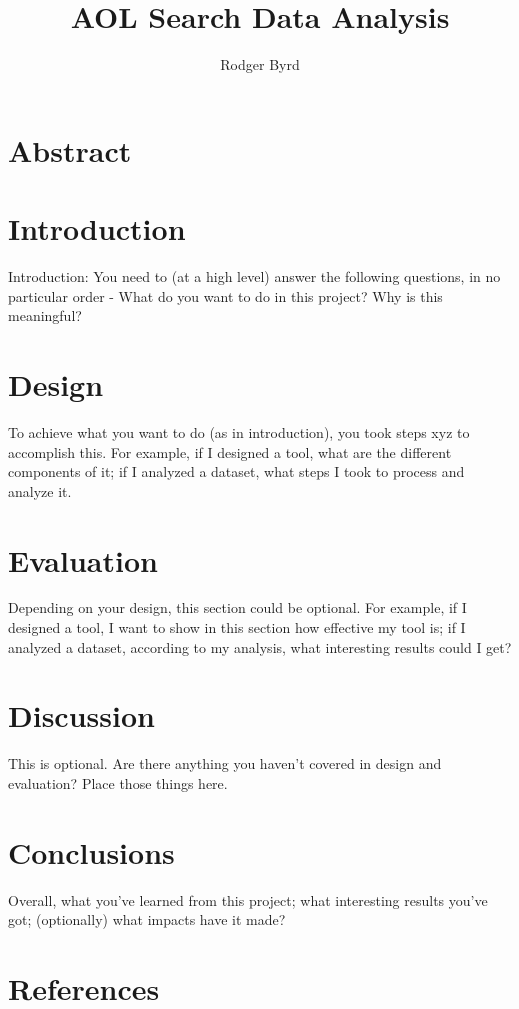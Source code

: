 \documentclass{article}
\begin{document}
\raggedright

\title{AOL Search Data Analysis}
\author{Rodger Byrd}
\maketitle

\section{Abstract}

\section{Introduction}
Introduction: You need to (at a high level) answer the following questions, in no particular order - What do you want to do in this project? Why is this meaningful? 

\section{Design}
To achieve what you want to do (as in introduction), you took steps xyz to accomplish this. For example, if I designed a tool, what are the different components of it; if I analyzed a dataset, what steps I took to process and analyze it.

\section{Evaluation}
Depending on your design, this section could be optional. For example, if I designed a tool, I want to show in this section how effective my tool is; if I analyzed a dataset, according to my analysis, what interesting results could I get?

\section{Discussion}
This is optional. Are there anything you haven't covered in design and evaluation? Place those things here.
\section{Conclusions}
Overall, what you've learned from this project; what interesting results you've got; (optionally) what impacts have it made?
\section{References}
\end{document}
